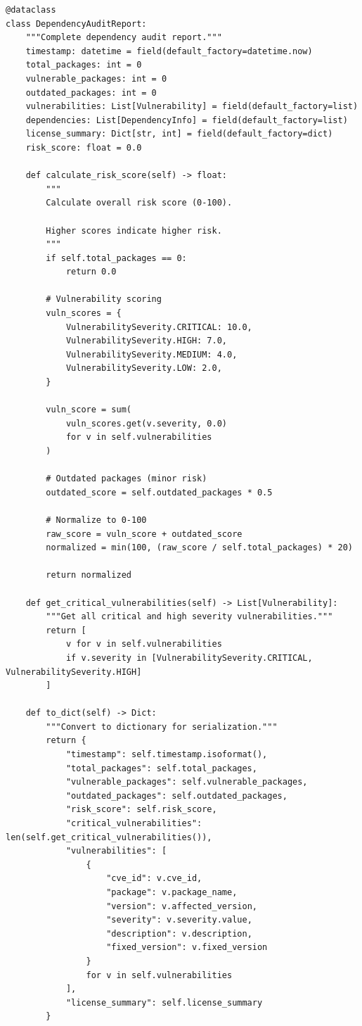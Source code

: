 \begin{lstlisting}[style=python, caption={Dependency auditing and vulnerability scanning}]
@dataclass
class DependencyAuditReport:
    """Complete dependency audit report."""
    timestamp: datetime = field(default_factory=datetime.now)
    total_packages: int = 0
    vulnerable_packages: int = 0
    outdated_packages: int = 0
    vulnerabilities: List[Vulnerability] = field(default_factory=list)
    dependencies: List[DependencyInfo] = field(default_factory=list)
    license_summary: Dict[str, int] = field(default_factory=dict)
    risk_score: float = 0.0

    def calculate_risk_score(self) -> float:
        """
        Calculate overall risk score (0-100).

        Higher scores indicate higher risk.
        """
        if self.total_packages == 0:
            return 0.0

        # Vulnerability scoring
        vuln_scores = {
            VulnerabilitySeverity.CRITICAL: 10.0,
            VulnerabilitySeverity.HIGH: 7.0,
            VulnerabilitySeverity.MEDIUM: 4.0,
            VulnerabilitySeverity.LOW: 2.0,
        }

        vuln_score = sum(
            vuln_scores.get(v.severity, 0.0)
            for v in self.vulnerabilities
        )

        # Outdated packages (minor risk)
        outdated_score = self.outdated_packages * 0.5

        # Normalize to 0-100
        raw_score = vuln_score + outdated_score
        normalized = min(100, (raw_score / self.total_packages) * 20)

        return normalized

    def get_critical_vulnerabilities(self) -> List[Vulnerability]:
        """Get all critical and high severity vulnerabilities."""
        return [
            v for v in self.vulnerabilities
            if v.severity in [VulnerabilitySeverity.CRITICAL, VulnerabilitySeverity.HIGH]
        ]

    def to_dict(self) -> Dict:
        """Convert to dictionary for serialization."""
        return {
            "timestamp": self.timestamp.isoformat(),
            "total_packages": self.total_packages,
            "vulnerable_packages": self.vulnerable_packages,
            "outdated_packages": self.outdated_packages,
            "risk_score": self.risk_score,
            "critical_vulnerabilities": len(self.get_critical_vulnerabilities()),
            "vulnerabilities": [
                {
                    "cve_id": v.cve_id,
                    "package": v.package_name,
                    "version": v.affected_version,
                    "severity": v.severity.value,
                    "description": v.description,
                    "fixed_version": v.fixed_version
                }
                for v in self.vulnerabilities
            ],
            "license_summary": self.license_summary
        }


\end{lstlisting}
